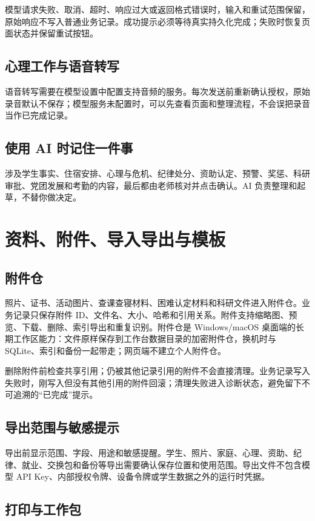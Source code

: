 \documentclass[UTF8,zihao=-4,oneside]{ctexrep}
\begin{document}
模型请求失败、取消、超时、响应过大或返回格式错误时，输入和重试范围保留，原始响应不写入普通业务记录。成功提示必须等待真实持久化完成；失败时恢复页面状态并保留重试按钮。

\section{心理工作与语音转写}

语音转写需要在模型设置中配置支持音频的服务。每次发送前重新确认授权，原始录音默认不保存；模型服务未配置时，可以先查看页面和整理流程，不会误把录音当作已完成记录。

\section{使用 AI 时记住一件事}

涉及学生事实、住宿安排、心理与危机、纪律处分、资助认定、预警、奖惩、科研审批、党团发展和考勤的内容，最后都由老师核对并点击确认。AI 负责整理和起草，不替你做决定。

\chapter{资料、附件、导入导出与模板}

\section{附件仓}

照片、证书、活动图片、查课查寝材料、困难认定材料和科研文件进入附件仓。业务记录只保存附件 ID、文件名、大小、哈希和引用关系。附件支持缩略图、预览、下载、删除、索引导出和重复识别。附件仓是 Windows/macOS 桌面端的长期工作区能力：文件原样保存到工作台数据目录的加密附件仓，换机时与 SQLite、索引和备份一起带走；网页端不建立个人附件仓。

删除附件前检查共享引用；仍被其他记录引用的附件不会直接清理。业务记录写入失败时，刚写入但没有其他引用的附件回滚；清理失败进入诊断状态，避免留下不可追溯的“已完成”提示。

\section{导出范围与敏感提示}

导出前显示范围、字段、用途和敏感提醒。学生、照片、家庭、心理、资助、纪律、就业、交换包和备份等导出需要确认保存位置和使用范围。导出文件不包含模型 API Key、内部授权令牌、设备令牌或学生数据之外的运行时凭据。

\section{打印与工作包}
\end{document}
